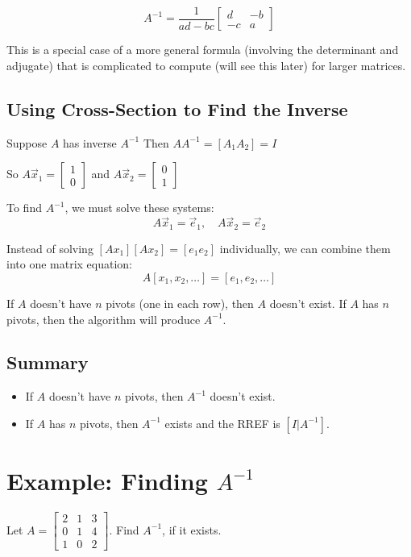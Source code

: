 \documentclass[12pt,a4paper]{article}
\begin{document}
\[A^{-1} = \frac{1}{ad-bc} \begin{bmatrix} d & -b \\ -c & a \end{bmatrix}\]

This is a special case of a more general formula (involving the determinant and adjugate) that is complicated to compute (will see this later) for larger matrices.

\subsection{Using Cross-Section to Find the Inverse}

Suppose $A$ has inverse $A^{-1}$
Then $AA^{-1} = [A_1 A_2] = I$

So $A\vec{x}_1 = \begin{bmatrix} 1 \\ 0 \end{bmatrix}$ and $A\vec{x}_2 = \begin{bmatrix} 0 \\ 1 \end{bmatrix}$

To find $A^{-1}$, we must solve these systems:
\[A\vec{x}_1 = \vec{e}_1, \quad A\vec{x}_2 = \vec{e}_2\]

Instead of solving $[Ax_1] [Ax_2] = [e_1 e_2]$ individually, we can combine them into one matrix equation:
\[A[x_1, x_2, \ldots] = [e_1, e_2, \ldots]\]

If $A$ doesn't have $n$ pivots (one in each row), then $A$ doesn't exist.
If $A$ has $n$ pivots, then the algorithm will produce $A^{-1}$.

\subsection{Summary}

\begin{itemize}
    \item If $A$ doesn't have $n$ pivots, then $A^{-1}$ doesn't exist.
    \item If $A$ has $n$ pivots, then $A^{-1}$ exists and the RREF is $[I|A^{-1}]$.
\end{itemize}

\section{Example: Finding $A^{-1}$}

Let $A = \begin{bmatrix} 2 & 1 & 3 \\ 0 & 1 & 4 \\ 1 & 0 & 2 \end{bmatrix}$. Find $A^{-1}$, if it exists.
\end{document}
